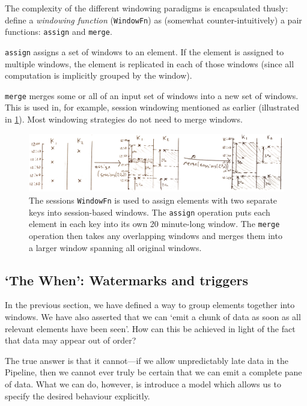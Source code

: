The complexity of the different windowing paradigms is encapsulated thusly:
define a \emph{windowing function} (\verb|WindowFn|) as (somewhat counter-intuitively) a pair functions: \texttt{assign} and \texttt{merge}.

\texttt{assign} assigns a set of windows to an element.
If the element is assigned to multiple windows, the element is replicated in each of those windows (since all computation is implicitly grouped by the window).

\texttt{merge} merges some or all of an input set of windows into a new set of windows.
This is used in, for example, session windowing mentioned as earlier (illustrated in \cref{fig:prep:sessions-merge}).
Most windowing strategies do not need to merge windows.

\begin{figure}[h]
	\includegraphics[width=\textwidth]{images/temp/sessions-assign-merge}
	\caption[An illustration of a \texttt{WindowFn} being used to place elements into session-based, unaligned windows.]
	{The sessions \texttt{WindowFn} is used to assign elements with two separate keys into session-based windows. The \texttt{assign} operation puts each element in each key into its own 20 minute-long window. The \texttt{merge} operation then takes any overlapping windows and merges them into a larger window spanning all original windows.}
	\label{fig:prep:sessions-merge}
\end{figure}


\subsection{`The When': Watermarks and triggers}\label{sec:prep:dataflow:when}

In the previous section, we have defined a way to group elements together into windows.
We have also asserted that we can `emit a chunk of data as soon as all relevant elements have been seen'.
How can this be achieved in light of the fact that data may appear out of order?

The true answer is that it cannot---if we allow unpredictably late data in the Pipeline, then we cannot ever truly be certain that we can emit a complete pane of data.
What we can do, however, is introduce a model which allows us to specify the desired behaviour explicitly.

